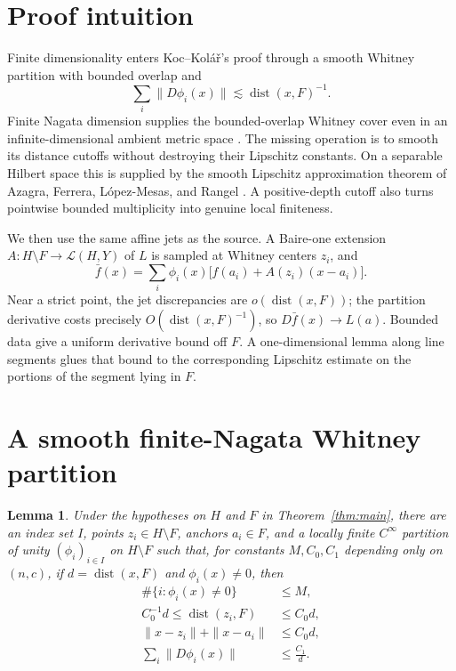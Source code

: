 \documentclass[11pt]{article}
\newtheorem{lemma}{Lemma}
\newcommand{\cL}{\mathcal L}
\newcommand{\dist}{\operatorname{dist}}
\begin{document}
\section{Proof intuition}

Finite dimensionality enters Koc--Kol\'a\v r's proof through a smooth Whitney
partition with bounded overlap and
\[
 \sum_i\|D\phi_i(x)\|\lesssim \dist(x,F)^{-1}.
\]
Finite Nagata dimension supplies the bounded-overlap Whitney cover even in an
infinite-dimensional ambient metric space \cite[Proposition 3.1]{Basso}.
The missing operation is to smooth its distance cutoffs without destroying
their Lipschitz constants.  On a separable Hilbert space this is supplied by
the smooth Lipschitz approximation theorem of Azagra, Ferrera,
L\'opez-Mesas, and Rangel \cite[Theorem 1]{AFLR}.  A positive-depth cutoff also
turns pointwise bounded multiplicity into genuine local finiteness.

We then use the same affine jets as the source.  A Baire-one extension
$A:H\setminus F\to\cL(H,Y)$ of $L$ is sampled at Whitney centers $z_i$,
and
\[
 \bar f(x)=\sum_i\phi_i(x)
 \bigl[f(a_i)+A(z_i)(x-a_i)\bigr].
\]
Near a strict point, the jet discrepancies are
$o(\dist(x,F))$; the partition derivative costs precisely
$O(\dist(x,F)^{-1})$, so $D\bar f(x)\to L(a)$.  Bounded data give a uniform
derivative bound off $F$.  A one-dimensional lemma along line segments glues
that bound to the corresponding Lipschitz estimate on the portions of the
segment lying in $F$.

\section{A smooth finite-Nagata Whitney partition}

\begin{lemma}\label{lem:partition}
Under the hypotheses on $H$ and $F$ in Theorem~\ref{thm:main}, there are an
index set $I$, points $z_i\in H\setminus F$, anchors $a_i\in F$, and a locally
finite $C^\infty$ partition of unity $(\phi_i)_{i\in I}$ on $H\setminus F$
such that, for constants $M,C_0,C_1$ depending only on $(n,c)$, if
$d=\dist(x,F)$ and $\phi_i(x)\ne0$, then
\begin{align}
 \#\{i:\phi_i(x)\ne0\}&\le M,\label{eq:mult}\\
 C_0^{-1}d\le \dist(z_i,F)&\le C_0d,\label{eq:scale}\\
 \|x-z_i\|+\|x-a_i\|&\le C_0d,\label{eq:geometry}\\
 \sum_i\|D\phi_i(x)\|&\le \frac{C_1}{d}.
 \label{eq:derivative-sum}
\end{align}
\end{lemma}
\end{document}
